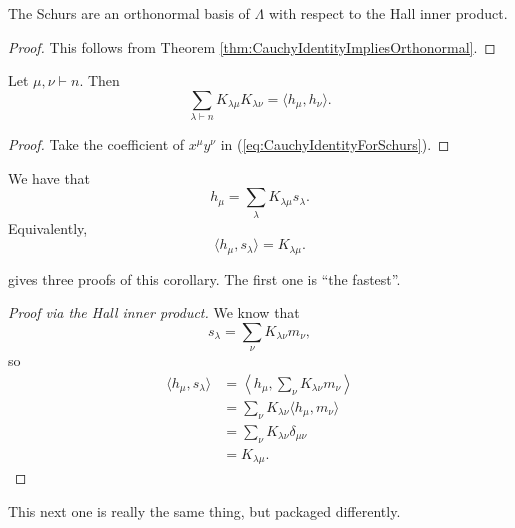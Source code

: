 \documentclass{article}
\begin{document}
\begin{corollary}
    The Schurs are an orthonormal basis of $\Lambda$ with respect to the Hall inner product.
\end{corollary}
\begin{proof}
    This follows from Theorem \ref{thm:CauchyIdentityImpliesOrthonormal}.
\end{proof}

\begin{corollary}
    Let $\mu,\nu \vdash n$. Then
    \[
        \sum_{\lambda \vdash n} K_{\lambda\mu}K_{\lambda\nu} = \langle h_\mu, h_\nu \rangle.
    \]
\end{corollary}

\begin{proof}
    Take the coefficient of $x^\mu y^\nu$ in (\ref{eq:CauchyIdentityForSchurs}).
\end{proof}

\begin{corollary}\label{thm:HToSIsKostka}
    We have that
    \[
        h_\mu = \sum_\lambda K_{\lambda\mu}s_\lambda.
    \]
    Equivalently,
    \[
        \langle h_\mu, s_\lambda \rangle = K_{\lambda\mu}.
    \]
\end{corollary}

\cite{StanleyEC2} gives three proofs of this corollary. The first one is ``the fastest''.

\begin{proof}[Proof via the Hall inner product]
    We know that
    \[
        s_\lambda = \sum_\nu K_{\lambda\nu} m_\nu,
    \]
    so 
    \begin{align*}
        \langle h_\mu, s_\lambda \rangle &= \left\langle h_\mu, \sum_\nu K_{\lambda\nu} m_\nu \right\rangle \\
                                         &=\sum_{\nu} K_{\lambda\nu} \langle h_\mu, m_\nu \rangle \\
                                         &=\sum_{\nu} K_{\lambda\nu} \delta_{\mu\nu} \\
                                         &= K_{\lambda\mu}.
    \end{align*}
\end{proof}

This next one is really the same thing, but packaged differently.
\end{document}
